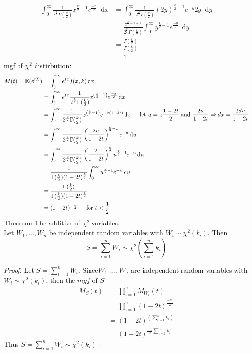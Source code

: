 \documentclass{article}
\newcommand{\E}{\mathbb{E}}
\newcommand{\sqr}[1]{{#1}^2}
\newcommand{\uint}[4]{\int_{#1}^{#2} #3 \dd #4}
\newcommand{\dd}{\mathop{}\!\mathrm{d}}
\begin{document}
\begin{align*}
    \uint{0}{\infty}{\frac{1}{2^{\frac{k}{2}}\Gamma(\frac{k}{2})}x^{\frac{k}{2}-1}e^{\frac{-x}{2}}}{x} &= \uint{0}{\infty}{\frac{1}{2^{\frac{k}{2}}\Gamma(\frac{k}{2})} (2y)^{\frac{k}{2} -1}e^{-y}2y}{y}\\
    &= \frac{2^{\frac{k}{2} - 1 + 1}}{2^{\frac{k}{2}}\Gamma(\frac{k}{2})}\uint{0}{\infty}{y^{\frac{k}{2} -1} e^{\frac{-y}{2}}}{y}\\
    &= \frac{\Gamma(\frac{k}{2})}{\Gamma(\frac{k}{2})}\\
    &= 1
\end{align*}
mgf of $\sqr{\chi}$ distirbution:
\begin{align*}
    M(t) = \E(e^{tX}) &= \uint{0}{\infty}{e^{tx}f(x, k)}{x} \\
&= \uint{0}{\infty}{e^{tx}\frac{1}{2^{\frac{k}{2}}\Gamma(\frac{k}{2})}x^{\left(\frac{k}{2} - 1\right)}e^{\frac{-x}{2}}}{x}\\
&= \uint{0}{\infty}{\frac{1}{2^{\frac{k}{2}} \Gamma(\frac{k}{2})} x^{\left(\frac{k}{2} - 1\right)} e^{-x\left(1- 2t\right)}}{x} \indent \text{let }u = x\frac{1-2t}{2} \text{ and } \frac{2u}{1-2t}\Rightarrow dx = \frac{2du}{1-2t}\\
&= \uint{0}{\infty}{\frac{1}{2^{\frac{k}{2}}\Gamma(\frac{k}{2})}\left(\frac{2u}{1-2t}\right)^{\frac{k}{2} -1 } e^{-u}}{u}\\
&= \uint{0}{\infty}{\frac{1}{2^{\frac{k}{2}}\Gamma(\frac{k}{2})}\left(\frac{2}{1-2t}\right)^{\frac{k}{2}}u^{\frac{k}{2} - 1}e^{-u}}{u}\\
&= \frac{1}{\Gamma(\frac{k}{2})(1-2t)^\frac{k}{2}}\uint{0}{\infty}{u^{\frac{k}{2} - 1}e^{-u}}{u}\\
&= \frac{\Gamma(\frac{k}{2})}{\Gamma(\frac{k}{2})(1-2t)^{\frac{k}{2}}}\\
&= (1 - 2t)^{-\frac{k}{2}} \indent \text{for } t < \frac{1}{2}
\end{align*}
\noindent Theorem: The additive of $\sqr{\chi}$ variables.\\
Let $W_1, \dotsc, W_n$ be independent random variables with $W_i\sim \sqr{\chi}(k_i)$. Then
\[
S = \sum_{i=1}^{n}W_i \sim \sqr{\chi}\left(\sum_{i=1}^{n}k_i\right)
\]
\begin{proof}
    Let $S = \sum_{i=1}^{n}W_i$. Since$W_1, \dotsc, W_n$ are independent random variables  with $W_i \sim \sqr{\chi}(k_i)$, then the $mgf$ of $S$
    \begin{align*}
        M_S(t) &= \prod_{i=1}^{n}M_{W_i}(t)\\
        &= \prod_{i=1}^{n}(1-2t)^{\frac{-k_i}{2}}\\
        &= (1-2t)^{\left(\sum_{i=1}^{n}k_i\right)}\\
        &= (1-2t)^{\frac{-1}{2}\sum_{i=1}^{n}k_i}
    \end{align*}
Thus $S = \sum_{i=1}^{n}W_i \sim \sqr{\chi}(k_i)$
\end{proof}
\end{document}
